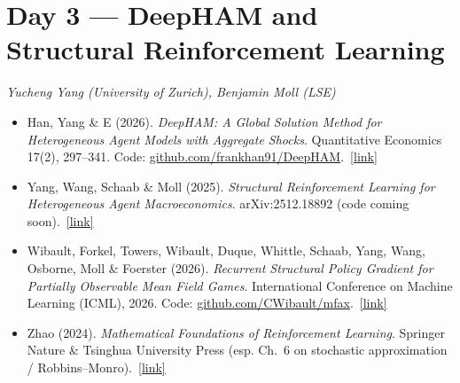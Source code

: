 \documentclass[11pt]{article}
\newcommand{\reading}[5]{%
  \item #1. \textit{#2}. #3.\ \href{#4}{[link]}%
}
\begin{document}
\section*{Day 3 --- DeepHAM and Structural Reinforcement Learning}
\textit{Yucheng Yang (University of Zurich), Benjamin Moll (LSE)}
\smallskip

\begin{itemize}
  \reading{Han, Yang \& E (2026)}{DeepHAM: A Global Solution Method for Heterogeneous Agent Models with Aggregate Shocks}{Quantitative Economics 17(2), 297--341. Code: \href{https://github.com/frankhan91/DeepHAM}{github.com/\allowbreak frankhan91/\allowbreak DeepHAM}}{https://doi.org/10.3982/QE2190}{The DeepHAM method: neural networks approximate value and policy functions and represent the cross-sectional distribution via learned generalized moments. Focus on the moment representation and the simulation-based training objective.}
  \reading{Yang, Wang, Schaab \& Moll (2025)}{Structural Reinforcement Learning for Heterogeneous Agent Macroeconomics}{arXiv:2512.18892 (code coming soon)}{https://arxiv.org/abs/2512.18892}{The basis for Moll's special online lecture: a structural RL method that uses low-dimensional prices as state variables and lets agents learn equilibrium price dynamics from simulated paths (Krusell--Smith, Huggett with aggregate shocks, HANK). Code coming soon.}
  \reading{Wibault, Forkel, Towers, Wibault, Duque, Whittle, Schaab, Yang, Wang, Osborne, Moll \& Foerster (2026)}{Recurrent Structural Policy Gradient for Partially Observable Mean Field Games}{International Conference on Machine Learning (ICML), 2026. Code: \href{https://github.com/CWibault/mfax}{github.com/\allowbreak CWibault/\allowbreak mfax}}{https://arxiv.org/abs/2602.20141}{A history-aware ``structural'' policy-gradient method for partially observable mean-field games with common noise that solves, for the first time, a macroeconomics mean-field game with heterogeneous agents and history-dependent policies; introduces the MFAX (JAX) framework. Code at \href{https://github.com/CWibault/mfax}{github.com/CWibault/mfax}.}
  \reading{Zhao (2024)}{Mathematical Foundations of Reinforcement Learning}{Springer Nature \& Tsinghua University Press (esp. Ch.~6 on stochastic approximation / Robbins--Monro)}{https://github.com/MathFoundationRL/Book-Mathematical-Foundation-of-Reinforcement-Learning}{}
\end{itemize}
\end{document}
